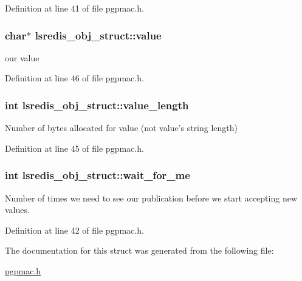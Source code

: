 Definition at line 41 of file pgpmac.\-h.

\hypertarget{structlsredis__obj__struct_a0465c65288e8101805a6f91049164517}{
\subsubsection[{value}]{\setlength{\rightskip}{0pt plus 5cm}char$\ast$ lsredis\-\_\-obj\-\_\-struct\-::value}}\label{structlsredis__obj__struct_a0465c65288e8101805a6f91049164517}


our value 



Definition at line 46 of file pgpmac.\-h.

\hypertarget{structlsredis__obj__struct_a664f0eaafb8dffc0dbde126e0340efb9}{
\subsubsection[{value\-\_\-length}]{\setlength{\rightskip}{0pt plus 5cm}int lsredis\-\_\-obj\-\_\-struct\-::value\-\_\-length}}\label{structlsredis__obj__struct_a664f0eaafb8dffc0dbde126e0340efb9}


Number of bytes allocated for value (not value's string length) 



Definition at line 45 of file pgpmac.\-h.

\hypertarget{structlsredis__obj__struct_a8bc1a536b7155a1e2a749c7c434b898b}{
\subsubsection[{wait\-\_\-for\-\_\-me}]{\setlength{\rightskip}{0pt plus 5cm}int lsredis\-\_\-obj\-\_\-struct\-::wait\-\_\-for\-\_\-me}}\label{structlsredis__obj__struct_a8bc1a536b7155a1e2a749c7c434b898b}


Number of times we need to see our publication before we start accepting new values. 



Definition at line 42 of file pgpmac.\-h.



The documentation for this struct was generated from the following file\-:\begin{DoxyCompactItemize}
\item 
\hyperlink{pgpmac_8h}{pgpmac.\-h}\end{DoxyCompactItemize}
